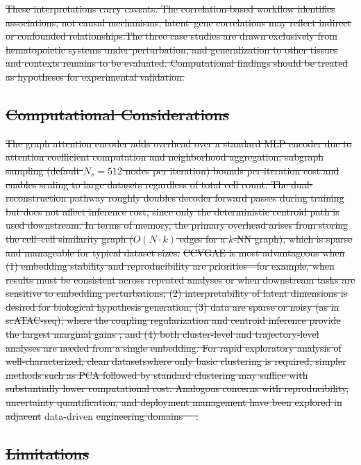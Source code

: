 \documentclass[referee, pdflatex, sn-vancouver-num]{sn-jnl}
\providecommand{\DIFaddtex}[1]{{\protect\color{blue}\uwave{#1}}} %
\providecommand{\DIFdeltex}[1]{{\protect\color{red}\sout{#1}}}                      %
\providecommand{\DIFaddbegin}{} %
\providecommand{\DIFaddend}{} %
\providecommand{\DIFdelbegin}{} %
\providecommand{\DIFdelend}{} %
\providecommand{\DIFadd}[1]{\texorpdfstring{\DIFaddtex{#1}}{#1}} %
\providecommand{\DIFdel}[1]{\texorpdfstring{\DIFdeltex{#1}}{}} %
\newcommand{\DIFscaledelfig}{0.5}
\newlength{\DIFdelgraphicswidth} %
\newlength{\DIFdelgraphicsheight} %
\newcommand{\DIFaddincludegraphics}[2][]{{\color{blue}\fbox{\DIFOincludegraphics[#1]{#2}}}} %
\newcommand{\DIFdelincludegraphics}[2][]{%
\sbox{\DIFdelgraphicsbox}{\DIFOincludegraphics[#1]{#2}}%
\settoboxwidth{\DIFdelgraphicswidth}{\DIFdelgraphicsbox} %
\settoboxtotalheight{\DIFdelgraphicsheight}{\DIFdelgraphicsbox} %
\scalebox{\DIFscaledelfig}{%
\parbox[b]{\DIFdelgraphicswidth}{\usebox{\DIFdelgraphicsbox}\\[-\baselineskip] \rule{\DIFdelgraphicswidth}{0em}}\llap{\resizebox{\DIFdelgraphicswidth}{\DIFdelgraphicsheight}{%
\setlength{\unitlength}{\DIFdelgraphicswidth}%
\begin{picture}(1,1)%
\thicklines\linethickness{2pt} %
{\color[rgb]{1,0,0}\put(0,0){\framebox(1,1){}}}%
{\color[rgb]{1,0,0}\put(0,0){\line( 1,1){1}}}%
{\color[rgb]{1,0,0}\put(0,1){\line(1,-1){1}}}%
\end{picture}%
}\hspace*{3pt}}} %
} %
\DeclareRobustCommand{\DIFaddbegin}{\DIFOaddbegin \let\includegraphics\DIFaddincludegraphics} %
\DeclareRobustCommand{\DIFaddend}{\DIFOaddend \let\includegraphics\DIFOincludegraphics} %
\DeclareRobustCommand{\DIFdelbegin}{\DIFOdelbegin \let\includegraphics\DIFdelincludegraphics} %
\DeclareRobustCommand{\DIFdelend}{\DIFOaddend \let\includegraphics\DIFOincludegraphics} %
\begin{document}
\DIFdel{These interpretations carry caveats. The correlation-based workflow identifies associations, not causal mechanisms; latent--gene correlations may reflect indirect or confounded relationships.The three case studies are drawn exclusively from hematopoietic systems under perturbation, and generalization to other tissues and contexts remains to be evaluated. Computational findings should be treated as hypotheses for experimental validation.
}%

\subsection*{\DIFdel{Computational Considerations}}

\DIFdel{The graph attention encoder adds overhead over a standard MLP encoder due to attention coefficient computation and neighborhood aggregation; subgraph sampling (default $N_s = 512$ nodes per iteration) bounds per-iteration cost and enables scaling to large datasets regardless of total cell count. The dual-reconstruction pathway roughly doubles decoder forward passes during training but does not affect inference cost, since only the deterministic centroid path is used downstream. In terms of memory, the primary overhead arises from storing the cell--cell similarity graph ($O(N \cdot k)$ edges for a $k$-NN graph), which is sparse and manageable for typical dataset sizes. }%
\DIFdel{CCVGAE is most advantageous when (1) embedding stability and reproducibility are priorities---for example, when results must be consistent across repeated analyses or when downstream tasks are sensitive to embedding perturbations; (2) interpretability of latent dimensions is desired for biological hypothesis generation; (3) data are sparse or noisy (as in scATAC-seq), where the coupling regularization and centroid inference provide the largest marginal gains ; and (4) both cluster-level and trajectory-level analyses are needed from a single embedding. For rapid exploratory analysis of well-characterized, clean datasetswhere only basic clustering is required, simpler methods such as PCA followed by standard clustering may suffice with substantially lower computational cost.
Analogous concerns with reproducibility, uncertainty quantification, and deployment management have been explored in adjacent }\DIFdelend \DIFaddbegin \DIFadd{panels represent }\DIFaddend data-driven \DIFdelbegin \DIFdel{engineering domains~\mbox{%
\cite{naeem2025infrastructure,naeem2025quality,naeem2025equipment,naeem2025bim,naeem2025digitaltwin}}\hskip0pt%
.
}\subsection*{\DIFdel{Limitations}}
\end{document}
